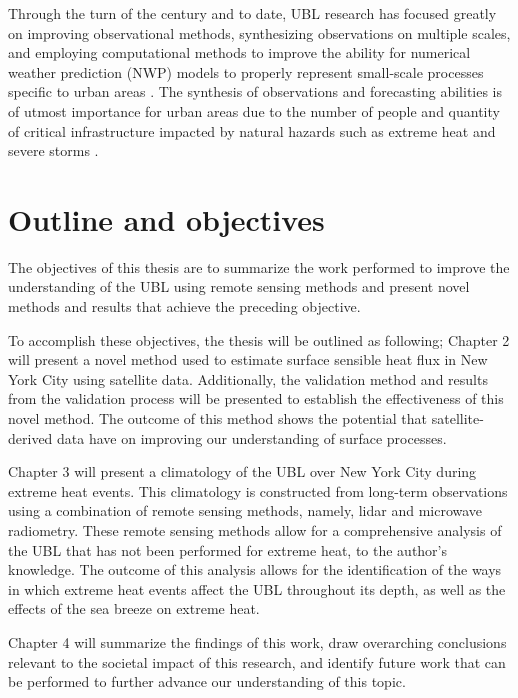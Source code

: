 Through the turn of the century and to date, UBL research has focused greatly on improving observational methods, synthesizing observations on multiple scales, and employing computational methods to improve the ability for numerical weather prediction (NWP) models to properly represent small-scale processes specific to urban areas \citep{barlow2014, grimmond2010international}. The synthesis of observations and forecasting abilities is of utmost importance for urban areas due to the number of people and quantity of critical infrastructure impacted by natural hazards such as extreme heat and severe storms \citep{sharif2006use, wilson1998nowcasting, lewis2017improvements}.

\section{Outline and objectives}
\label{sec:outline}

The objectives of this thesis are to summarize the work performed to improve the understanding of the UBL using remote sensing methods and present novel methods and results that achieve the preceding objective.

To accomplish these objectives, the thesis will be outlined as following; Chapter 2 will present a novel method used to estimate surface sensible heat flux in New York City using satellite data. Additionally, the validation method and results from the validation process will be presented to establish the effectiveness of this novel method. The outcome of this method shows the potential that satellite-derived data have on improving our understanding of  surface processes.

Chapter 3 will present a climatology of the UBL over New York City during extreme heat events. This climatology is constructed from long-term observations using a combination of remote sensing methods, namely, lidar and microwave radiometry. These remote sensing methods allow for a comprehensive analysis of the UBL that has not been performed for extreme heat, to the author's knowledge. The outcome of this analysis allows for the identification of the ways in which extreme heat events affect the UBL throughout its depth, as well as the effects of the sea breeze on extreme heat.

Chapter 4 will summarize the findings of this work, draw overarching conclusions relevant to the societal impact of this research, and identify future work that can be performed to further advance our understanding of this topic.
